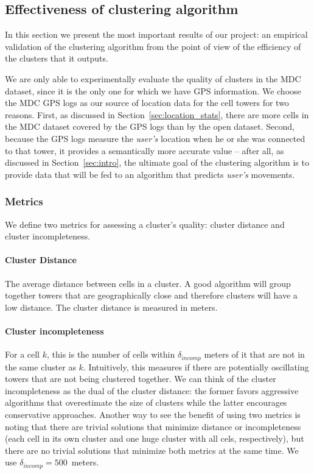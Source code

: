 \documentclass[letterpaper, 12pt, conference]{ieeeconf}
\begin{document}
\subsection{Effectiveness of clustering algorithm}
\label{sec:effectiveness}
In this section we present the most important results of our project: an 
empirical validation of the clustering algorithm from the point of view of 
the efficiency of the clusters that it outputs.

We are only able to experimentally evaluate the quality of clusters in the 
MDC dataset, since it is the only one for which we have GPS information. We 
choose the MDC GPS logs as our source of location data for the cell towers 
for two reasons. First, as discussed in Section~\ref{sec:location_stats}, 
there are more cells in the MDC dataset covered by the GPS logs than by the 
open dataset. Second, because the GPS logs measure the \textit{user's} 
location when he or she was connected to that tower, it provides a 
semantically more accurate value -- after all, as discussed in
Section~\ref{sec:intro}, the ultimate goal of the clustering algorithm is to provide data 
that will be fed to an algorithm that predicts \textit{user's} movements.
\subsubsection{Metrics}



We define two metrics for assessing a cluster's quality: cluster distance and 
cluster incompleteness.

\paragraph{Cluster Distance} The average distance between cells in a cluster. 
A good algorithm will group together towers that are geographically close and 
therefore clusters will have a low distance. The cluster distance is measured 
in meters.

\paragraph{Cluster incompleteness} For a cell $k$, this is the number of 
cells within $\delta_{incomp}$ meters of it that are not in the same cluster 
as $k$. Intuitively, this measures if there are potentially oscillating towers 
that are not being clustered together. We can think of the cluster 
incompleteness as the dual of the cluster distance: the former favors 
aggressive algorithms that overestimate the size of clusters while the latter encourages conservative approaches. 
Another way to see the benefit of using two metrics is noting that there are 
trivial solutions that minimize distance or incompleteness (each cell in its 
own cluster and one huge cluster with all cels, respectively), but there are 
no trivial solutions that minimize both metrics at the same time. We use
$\delta_{incomp} = 500$~meters.
\end{document}
